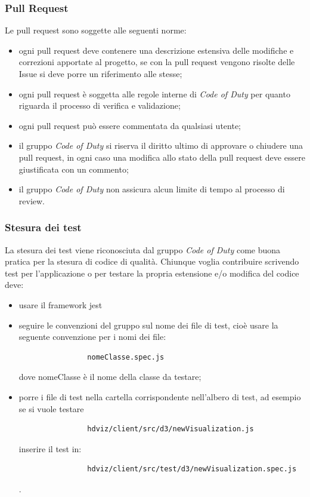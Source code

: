         \subsubsection{Pull Request}
        Le pull request sono soggette alle seguenti norme:
        \begin{itemize}
            \item ogni pull request deve contenere una descrizione estensiva delle modifiche e correzioni apportate al progetto, se con la pull request vengono risolte delle Issue si deve porre un riferimento alle stesse;
            \item ogni pull request è soggetta alle regole interne di \textit{Code of Duty} per quanto riguarda il processo di verifica e validazione;
            \item ogni pull request può essere commentata da qualsiasi utente;
            \item il gruppo \textit{Code of Duty} si riserva il diritto ultimo di approvare o chiudere una pull request, in ogni caso una modifica allo stato della pull request deve essere giustificata con un commento;
            \item il gruppo \textit{Code of Duty} non assicura alcun limite di tempo al processo di review.
        \end{itemize}
        \subsubsection{Stesura dei test}
        La stesura dei test viene riconosciuta dal gruppo \textit{Code of Duty} come buona pratica per la stesura di codice di qualità. Chiunque voglia contribuire scrivendo test per l'applicazione o per testare la propria estensione e/o modifica del codice deve:
        \begin{itemize}
            \item usare il framework jest
            \item seguire le convenzioni del gruppo sul nome dei file di test, cioè usare la seguente convenzione per i nomi dei file:
            \begin{verbatim}
                nomeClasse.spec.js
            \end{verbatim}
            dove nomeClasse è il nome della classe da testare;
            \item porre i file di test nella cartella corrispondente nell'albero di test, ad esempio se si vuole testare
            \begin{verbatim}
                hdviz/client/src/d3/newVisualization.js
            \end{verbatim}
            inserire il test in:
            \begin{verbatim}
                hdviz/client/src/test/d3/newVisualization.spec.js
            \end{verbatim}.
        \end{itemize}

